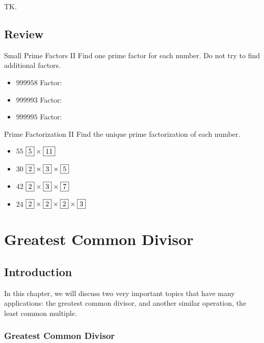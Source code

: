\documentclass[a4paper,10pt]{report}
\begin{document}
TK.

\section{Review}

\begin{problem}{Small Prime Factors II}
 Find one prime factor for each number. Do not try to find additional factors.

 \begin{itemize}
  \item \(999958\) \hfill Factor: 
  \item \(999993\) \hfill Factor: 
  \item \(999995\) \hfill Factor: 
 \end{itemize}

\end{problem}

\begin{problem}{Prime Factorization II}
 Find the unique prime factorization of each number.

 \begin{itemize}
  \item \(55\) \hfill \(\Ans{5} \times \Ans{11}\)
  \item \(30\) \hfill \(\Ans{2} \times \Ans{3} \times \Ans{5}\)
  \item \(42\) \hfill \(\Ans{2} \times \Ans{3} \times \Ans{7}\)
  \item \(24\) \hfill \(\Ans{2} \times \Ans{2} \times \Ans{2} \times \Ans{3}\)
 \end{itemize}
\end{problem}


\chapter{Greatest Common Divisor}

\section{Introduction}

In this chapter, we will discuss two very important
topics that have many applications: the greatest common divisor, and another
similar operation, the least common multiple.

\subsection{Greatest Common Divisor}
\end{document}
